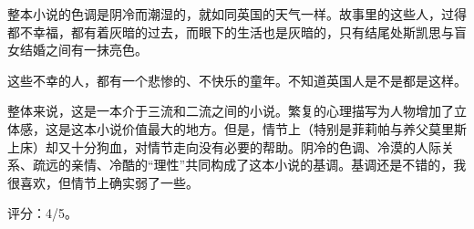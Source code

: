 整本小说的色调是阴冷而潮湿的，就如同英国的天气一样。故事里的这些人，过得都不幸福，都有着灰暗的过去，而眼下的生活也是灰暗的，只有结尾处斯凯思与盲女结婚之间有一抹亮色。

这些不幸的人，都有一个悲惨的、不快乐的童年。不知道英国人是不是都是这样。

整体来说，这是一本介于三流和二流之间的小说。繁复的心理描写为人物增加了立体感，这是这本小说价值最大的地方。但是，情节上（特别是菲莉帕与养父莫里斯上床）却又十分狗血，对情节走向没有必要的帮助。阴冷的色调、冷漠的人际关系、疏远的亲情、冷酷的“理性”共同构成了这本小说的基调。基调还是不错的，我很喜欢，但情节上确实弱了一些。

评分：4/5。